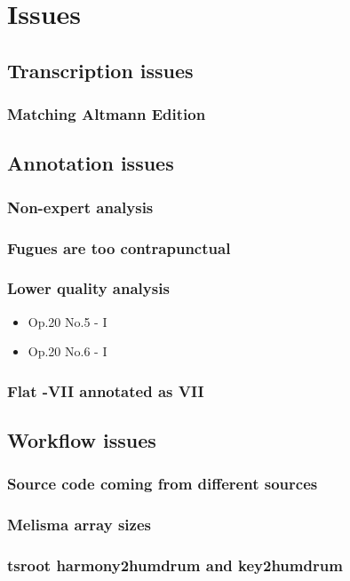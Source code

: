 \section{Issues}
	\subsection{Transcription issues}
		\subsubsection{Matching Altmann Edition}
	\subsection{Annotation issues}
		\subsubsection{Non-expert analysis}
		\subsubsection{Fugues are too contrapunctual}
		\subsubsection{Lower quality analysis}
    \begin{itemize}
    \item Op.20 No.5 - I
		\item Op.20 No.6 - I
    \end{itemize}
		\subsubsection{Flat -VII annotated as VII}
	\subsection{Workflow issues}
		\subsubsection{Source code coming from different sources}
		\subsubsection{Melisma array sizes}
		\subsubsection{tsroot harmony2humdrum and key2humdrum}
